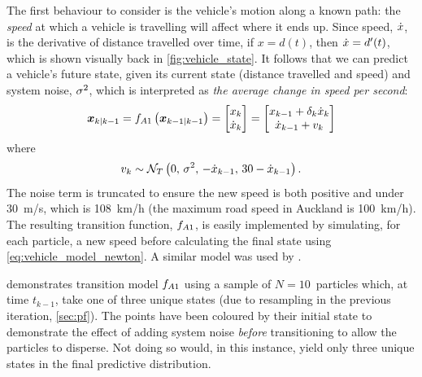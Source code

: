 The first behaviour to consider is the vehicle's motion along a known path: the \emph{speed} at which a vehicle is travelling will affect where it ends up. Since speed, $\dot x$, is the derivative of distance travelled over time, if $x = d(t)$, then $\dot x = d'(t)$, which is shown visually back in \cref{fig:vehicle_state}. It follows that we can predict a vehicle's future state, given its current state (distance travelled and speed) and system noise, $\sigma^2$, which is interpreted as \emph{the average change in speed per second}:
\begin{equation}
\label{eq:vehicle_model_newton}
\boldsymbol x_{k|k-1} = f_{A1}\left(\boldsymbol x_{k-1|k-1}\right) =
\begin{bmatrix}
x_k \\ \dot x_k
\end{bmatrix} =
\begin{bmatrix}
x_{k-1} + \delta_k\dot x_k \\
\dot x_{k-1} + v_k
\end{bmatrix}
\end{equation}
where
\begin{equation}\label{eq:vehicle_model_newton_noise}
v_k \sim \mathcal{N}_T\left(0,\, \sigma^2,\, -\dot x_{k-1},\, 30 - \dot x_{k-1}\right).
\end{equation}
The noise term is truncated to ensure the new speed is both positive and under 30~m/s, which is 108~km/h (the maximum road speed in Auckland is 100~km/h). The resulting transition function, $f_{A1}$, is easily implemented by simulating, for each particle, a new speed before calculating the final state using \cref{eq:vehicle_model_newton}. A similar model was used by \citet{Cathey_2003,Dailey_2001}.


 demonstrates transition model $f_{A1}$ using a sample of $N=10$~particles which, at time $t_{k-1}$, take one of three unique states (due to resampling in the previous iteration, \cref{sec:pf}). The points have been coloured by their initial state to demonstrate the effect of adding system noise \emph{before} transitioning to allow the particles to disperse. Not doing so would, in this instance, yield only three unique states in the final predictive distribution.

